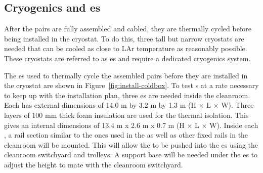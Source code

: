 \subsection{Cryogenics and \coldbox{}es}
\label{sec:fdsp-tc-infr-cryo}



After the  pairs are fully assembled and cabled, they are thermally cycled before being installed in the cryostat. %
To do this, three tall but narrow cryostats are needed that can be cooled as close to LAr temperature as reasonably possible. These cryostats are referred to as \coldbox{}es and require a dedicated cryogenics system. 


The \coldbox{}es used to thermally cycle the assembled  pairs before they are installed in the cryostat are shown in Figure~\ref{fig:install-coldbox}. 
To test s at a rate necessary to keep up with the installation plan, three \coldbox{}es are needed inside the cleanroom. 
Each \coldbox has external dimensions of 14.0 \si{m} by 3.2 \si{m} by 1.3 \si{m} (H $\times$ L $\times$ W). 
Three layers of 100 \si{mm} thick foam insulation are used for the thermal isolation. 
This gives an internal dimensions of 13.4 \si{m} x 2.6 \si{m} x 0.7 \si{m} (H $\times$ L $\times$ W). 
Inside each \coldbox, a rail section similar to the ones used in the  as well as other fixed rails in the cleanroom will be mounted.
This will allow the  to be pushed into the \coldbox{}es using the cleanroom switchyard and trolleys. 
A support base will be needed under the \coldbox{}es to adjust the height to mate with the cleanroom switchyard.

